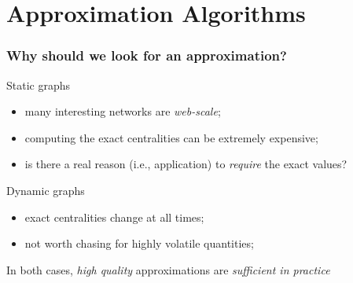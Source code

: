 \section{Approximation Algorithms}

\begin{frame}
  \frametitle{Why should we look for an approximation?}
  \begin{block}{Static graphs}
    \begin{itemize}
      \item many interesting networks are \emph{web-scale};
      \item computing the exact centralities can be extremely expensive;
      \item is there a real reason (i.e., application) to \emph{require} the
        exact values?
    \end{itemize}
  \end{block}
  \pause
  \begin{block}{Dynamic graphs}
    \begin{itemize}
      \item exact centralities change at all times;
      \item not worth chasing for highly volatile quantities;
    \end{itemize}
  \end{block}
  \pause
  In both cases, \emph{high quality} approximations are \emph{sufficient in
  practice}
\end{frame}

